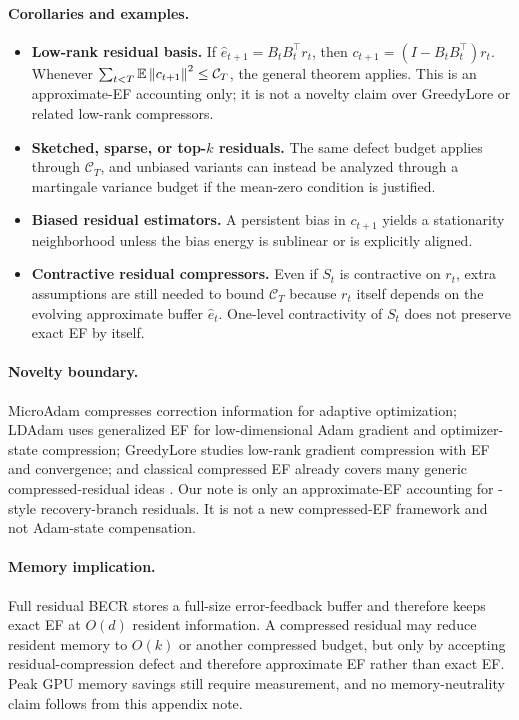 \paragraph{Corollaries and examples.}
\begin{itemize}
\item \textbf{Low-rank residual basis.}
If $\hat e_{t+1}=B_tB_t^\top r_t$, then
$c_{t+1}=(I-B_tB_t^\top)r_t$. Whenever
$\sum_{t<T}\mathbb{E}\left\lVert c_{t+1} \right\rVert^2\le \mathcal C_T$, the general theorem applies.
This is an approximate-EF accounting only; it is not a novelty claim over
GreedyLore or related low-rank compressors.
\item \textbf{Sketched, sparse, or top-$k$ residuals.}
The same defect budget applies through $\mathcal C_T$, and unbiased variants
can instead be analyzed through a martingale variance budget if the
mean-zero condition is justified.
\item \textbf{Biased residual estimators.}
A persistent bias in $c_{t+1}$ yields a stationarity neighborhood unless the
bias energy is sublinear or is explicitly aligned.
\item \textbf{Contractive residual compressors.}
Even if $S_t$ is contractive on $r_t$, extra assumptions are still needed to
bound $\mathcal C_T$ because $r_t$ itself depends on the evolving approximate
buffer $\hat e_t$. One-level contractivity of $S_t$ does not preserve exact
EF by itself.
\end{itemize}

\paragraph{Novelty boundary.}
MicroAdam compresses correction information for adaptive optimization;
LDAdam uses generalized EF for low-dimensional Adam gradient and optimizer-state
compression; GreedyLore studies low-rank gradient compression with EF and
convergence; and classical compressed EF already covers many generic
compressed-residual ideas \citep{microadam,ldadam,greedylore,errorfeedback}.
Our note is only an approximate-EF accounting for \Fira-style recovery-branch
residuals. It is not a new compressed-EF framework and not Adam-state
compensation.

\paragraph{Memory implication.}
Full residual BECR stores a full-size error-feedback buffer and therefore keeps
exact EF at $O(d)$ resident information. A compressed residual may reduce
resident memory to $O(k)$ or another compressed budget, but only by accepting
residual-compression defect and therefore approximate EF rather than exact EF.
Peak GPU memory savings still require measurement, and no memory-neutrality
claim follows from this appendix note.

